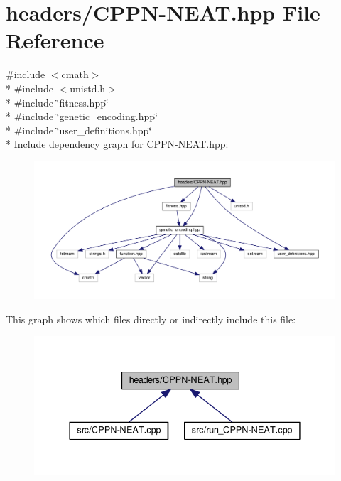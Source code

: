\hypertarget{_c_p_p_n-_n_e_a_t_8hpp}{\section{headers/\-C\-P\-P\-N-\/\-N\-E\-A\-T.hpp File Reference}
\label{_c_p_p_n-_n_e_a_t_8hpp}
}
{\ttfamily \#include $<$cmath$>$}\\*
{\ttfamily \#include $<$unistd.\-h$>$}\\*
{\ttfamily \#include \char`\"{}fitness.\-hpp\char`\"{}}\\*
{\ttfamily \#include \char`\"{}genetic\-\_\-encoding.\-hpp\char`\"{}}\\*
{\ttfamily \#include \char`\"{}user\-\_\-definitions.\-hpp\char`\"{}}\\*
Include dependency graph for C\-P\-P\-N-\/\-N\-E\-A\-T.hpp\-:
\nopagebreak
\begin{figure}[H]
\begin{center}
\leavevmode
\includegraphics[width=350pt]{_c_p_p_n-_n_e_a_t_8hpp__incl}
\end{center}
\end{figure}
This graph shows which files directly or indirectly include this file\-:
\nopagebreak
\begin{figure}[H]
\begin{center}
\leavevmode
\includegraphics[width=337pt]{_c_p_p_n-_n_e_a_t_8hpp__dep__incl}
\end{center}
\end{figure}
